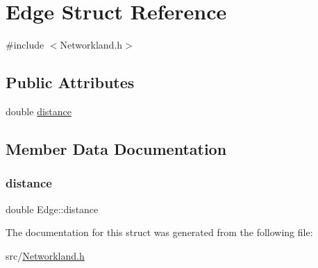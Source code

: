 \hypertarget{structEdge}{}\section{Edge Struct Reference}
\label{structEdge}


{\ttfamily \#include $<$Networkland.\+h$>$}

\subsection*{Public Attributes}
\begin{DoxyCompactItemize}
\item 
double \hyperlink{structEdge_a697dbb39235e54e2dce0e85d213bc753}{distance}
\end{DoxyCompactItemize}


\subsection{Member Data Documentation}
\mbox{\label{structEdge_a697dbb39235e54e2dce0e85d213bc753}} 
\subsubsection{\texorpdfstring{distance}{distance}}
{\footnotesize\ttfamily double Edge\+::distance}



The documentation for this struct was generated from the following file\+:\begin{DoxyCompactItemize}
\item 
src/\hyperlink{Networkland_8h}{Networkland.\+h}\end{DoxyCompactItemize}
